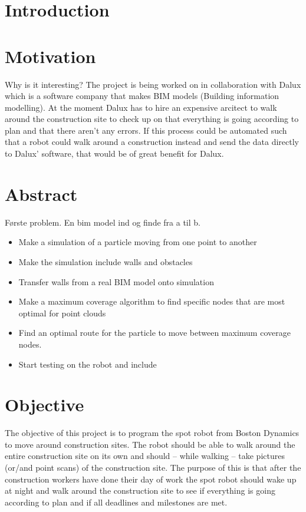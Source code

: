\section{Introduction}

\section*{Motivation}
Why is it interesting?
The project is being worked on in collaboration with Dalux which is a software company that makes BIM models (Building information modelling). At the moment Dalux has to hire an expensive arcitect to walk around the construction site to check up on that everything is going according to plan and that there aren’t any errors. If this process could be automated such that a robot could walk around a construction instead and send the data directly to Dalux’ software, that would be of great benefit for Dalux. 


\section{Abstract}
Første problem. En bim model ind og finde fra a til b.
\begin{itemize}
    \item Make a simulation of a particle moving from one point to another
    \item Make the simulation include walls and obstacles
    \item Transfer walls from a real BIM model onto simulation
    \item Make a maximum coverage algorithm to find specific nodes that are most optimal for point clouds
    \item Find an optimal route for the particle to move between maximum coverage nodes.
    \item Start testing on the robot and include 
\end{itemize}



\section*{Objective}
The objective of this project is to program the spot robot from Boston Dynamics
to move around construction sites. The robot should be able to walk around the entire construction site on its own and should – while walking – take pictures (or/and point scans) of the construction site. The purpose of this is that after the construction workers have done their day of work the spot robot should wake up at night and walk around the construction site to see if everything is going according to plan and if all deadlines and milestones are met.

